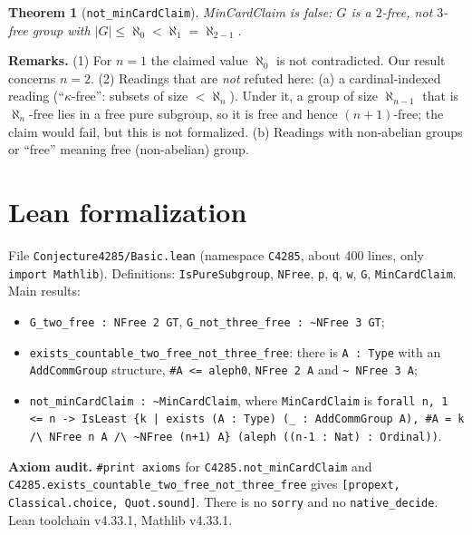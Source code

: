 \documentclass[11pt]{article}
\newtheorem{theorem}{Theorem}
\theoremstyle{definition}
\begin{document}
\begin{theorem}[\texttt{not\_minCardClaim}]
MinCardClaim is false: $G$ is a $2$-free, not $3$-free group with $|G|\le\aleph_0<\aleph_1=\aleph_{2-1}$.
\end{theorem}

\textbf{Remarks.} (1) For $n=1$ the claimed value $\aleph_0$ is not contradicted. Our result concerns
$n=2$. (2) Readings that are \emph{not} refuted here: (a) a cardinal-indexed
reading (``$\kappa$-free'': subsets of size $<\aleph_n$). Under it, a group of size $\aleph_{n-1}$ that
is $\aleph_n$-free lies in a free pure subgroup, so it is free and hence $(n+1)$-free; the claim would
fail, but this is not formalized. (b) Readings with non-abelian groups or ``free'' meaning free
(non-abelian) group.

\section{Lean formalization}
File \texttt{Conjecture4285/Basic.lean} (namespace \texttt{C4285}, about 400 lines, only
\texttt{import Mathlib}). Definitions: \texttt{IsPureSubgroup}, \texttt{NFree}, \texttt{p},
\texttt{q}, \texttt{w}, \texttt{G}, \texttt{MinCardClaim}. Main results:
\begin{itemize}
\item \texttt{G\_two\_free : NFree 2 GT}, \texttt{G\_not\_three\_free : \textasciitilde NFree 3 GT};
\item \texttt{exists\_countable\_two\_free\_not\_three\_free}: there is \texttt{A : Type} with an
\texttt{AddCommGroup} structure, \texttt{\#A <= aleph0}, \texttt{NFree 2 A} and \texttt{\textasciitilde
NFree 3 A};
\item \texttt{not\_minCardClaim : \textasciitilde MinCardClaim}, where \texttt{MinCardClaim} is
\texttt{forall n, 1 <= n -> IsLeast \{k | exists (A : Type) (\_ : AddCommGroup A), \#A = k /\textbackslash{}
NFree n A /\textbackslash{} \textasciitilde NFree (n+1) A\} (aleph ((n-1 : Nat) : Ordinal))}.
\end{itemize}
\textbf{Axiom audit.} \texttt{\#print axioms} for \texttt{C4285.not\_minCardClaim} and
\texttt{C4285.exists\_countable\_two\_free\_not\_three\_free} gives \texttt{[propext,
Classical.choice, Quot.sound]}. There is no \texttt{sorry} and no \texttt{native\_decide}. Lean
toolchain v4.33.1, Mathlib v4.33.1.
\end{document}
